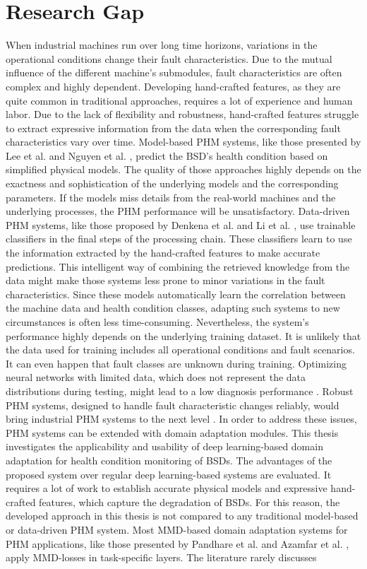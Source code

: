 \section{Research Gap}
When industrial machines run over long time horizons, variations in the operational conditions change their fault characteristics. Due to the mutual influence of the different machine's submodules, fault characteristics are often complex and highly dependent. Developing hand-crafted features, as they are quite common in traditional approaches, requires a lot of experience and human labor. Due to the lack of flexibility and robustness, hand-crafted features struggle to extract expressive information from the data when the corresponding fault characteristics vary over time. Model-based PHM systems, like those presented by Lee et al. \cite{Lee2015} and Nguyen et al. \cite{NGUYEN2019},  predict the BSD's health condition based on simplified physical models. The quality of those approaches highly depends on the exactness and sophistication of the underlying models and the corresponding parameters. If the models miss details from the real-world machines and the underlying processes, the PHM performance will be unsatisfactory. Data-driven PHM systems, like those proposed by Denkena et al. \cite{Denkena2021} and Li et al. \cite{LiPin2018}, use trainable classifiers in the final steps of the processing chain. These classifiers learn to use the information extracted by the hand-crafted features to make accurate predictions. This intelligent way of combining the retrieved knowledge from the data might make those systems less prone to minor variations in the fault characteristics. Since these models automatically learn the correlation between the machine data and health condition classes, adapting such systems to new circumstances is often less time-consuming. Nevertheless, the system's performance highly depends on the underlying training dataset. It is unlikely that the data used for training includes all operational conditions and fault scenarios. It can even happen that fault classes are unknown during training. Optimizing neural networks with limited data, which does not represent the data distributions during testing, might lead to a low diagnosis performance \cite{AZAMFAR2020103932}. Robust PHM systems, designed to handle fault characteristic changes reliably, would bring industrial PHM systems to the next level \cite{Michau2017}. In order to address these issues, PHM systems can be extended with domain adaptation modules. This thesis investigates the applicability and usability of deep learning-based domain adaptation for health condition monitoring of BSDs. The advantages of the proposed system over regular deep learning-based systems are evaluated. It requires a lot of work to establish accurate physical models and expressive hand-crafted features, which capture the degradation of BSDs. For this reason, the developed approach in this thesis is not compared to any traditional model-based or data-driven PHM system. Most MMD-based domain adaptation systems for PHM applications, like those presented by Pandhare et al. \cite{Pandhare2021} and Azamfar et al. \cite{AZAMFAR2020103932}, apply MMD-losses in task-specific layers. The literature rarely discusses 